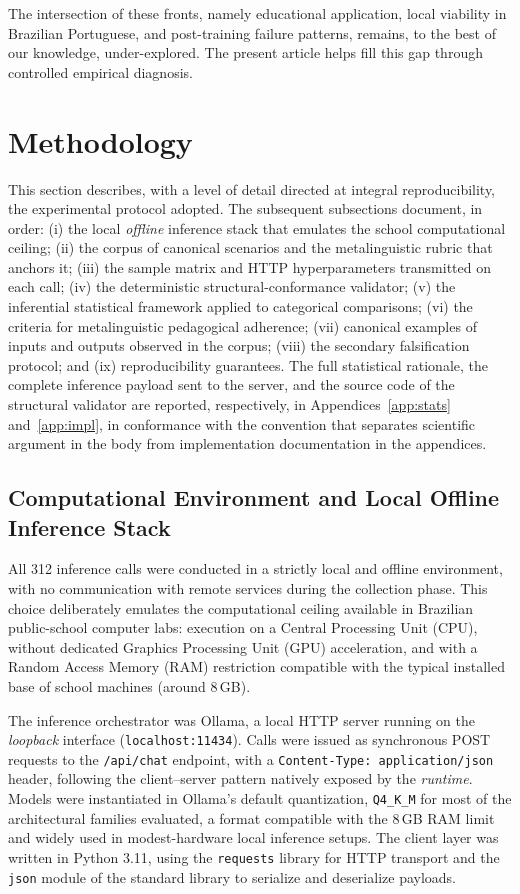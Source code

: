 \documentclass{sbc2023}%
\begin{document}
The intersection of these fronts, namely educational application, local viability in Brazilian Portuguese, and post-training failure patterns, remains, to the best of our knowledge, under-explored. The present article helps fill this gap through controlled empirical diagnosis.

\section{Methodology}
\label{sec:method}

This section describes, with a level of detail directed at integral reproducibility, the experimental protocol adopted. The subsequent subsections document, in order: (i) the local \textit{offline} inference stack that emulates the school computational ceiling; (ii) the corpus of canonical scenarios and the metalinguistic rubric that anchors it; (iii) the sample matrix and HTTP hyperparameters transmitted on each call; (iv) the deterministic structural-conformance validator; (v) the inferential statistical framework applied to categorical comparisons; (vi) the criteria for metalinguistic pedagogical adherence; (vii) canonical examples of inputs and outputs observed in the corpus; (viii) the secondary falsification protocol; and (ix) reproducibility guarantees. The full statistical rationale, the complete inference payload sent to the server, and the source code of the structural validator are reported, respectively, in Appendices~\ref{app:stats} and~\ref{app:impl}, in conformance with the convention that separates scientific argument in the body from implementation documentation in the appendices.

\subsection{Computational Environment and Local Offline Inference Stack}

All 312 inference calls were conducted in a strictly local and offline environment, with no communication with remote services during the collection phase. This choice deliberately emulates the computational ceiling available in Brazilian public-school computer labs: execution on a Central Processing Unit (CPU), without dedicated Graphics Processing Unit (GPU) acceleration, and with a Random Access Memory (RAM) restriction compatible with the typical installed base of school machines (around 8\,GB).

The inference orchestrator was Ollama, a local HTTP server running on the \textit{loopback} interface (\texttt{localhost:11434}). Calls were issued as synchronous POST requests to the \texttt{/api/chat} endpoint, with a \texttt{Content-Type: application/json} header, following the client--server pattern natively exposed by the \textit{runtime}. Models were instantiated in Ollama's default quantization, \texttt{Q4\_K\_M} for most of the architectural families evaluated, a format compatible with the 8\,GB RAM limit and widely used in modest-hardware local inference setups. The client layer was written in Python 3.11, using the \texttt{requests} library for HTTP transport and the \texttt{json} module of the standard library to serialize and deserialize payloads.
\end{document}
